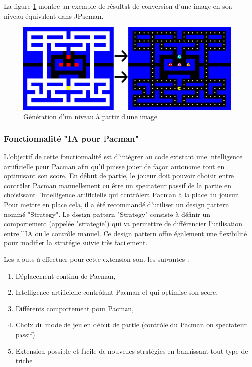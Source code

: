 \documentclass[12pt, openany]{report}
\begin{document}
La figure \ref{map_generator_img} montre un exemple de résultat de conversion d'une image en son niveau équivalent dans JPacman.
\begin{figure}[h]
	\centering
	\includegraphics[width=13cm]{Images/mapgenerator.jpg}
	\caption{\label{map_generator_img} Génération d'un niveau à partir d'une image}
\end{figure}

\subsubsection{Fonctionnalité "IA pour Pacman"}

L'objectif de cette fonctionnalité est d'intégrer au code existant une intelligence artificielle pour Pacman afin qu'il puisse jouer de façon autonome tout en optimisant son score. En début de partie, le joueur doit pouvoir choisir entre contrôler Pacman manuellement ou être un spectateur passif de la partie en choisissant l'intelligence artificielle qui contrôlera Pacman à la place du joueur. Pour mettre en place cela, il a été recommandé d'utiliser un design pattern nommé "Strategy". Le design pattern "Strategy" consiste à définir un comportement (appelée "strategie") qui va permettre de différencier l'utilisation entre l'IA ou le contrôle manuel. Ce design pattern offre également une flexibilité pour modifier la stratégie suivie très facilement.

Les ajouts à effectuer pour cette extension sont les suivantes :
\begin{enumerate}
	\item Déplacement continu de Pacman,
	\item Intelligence artificielle contrôlant Pacman et qui optimise son score,
	\item Différents comportement pour Pacman,
	\item Choix du mode de jeu en début de partie (contrôle du Pacman ou spectateur passif)
	\item Extension possible et facile de nouvelles stratégies en bannissant tout type de triche \\
	
\end{enumerate} 
\end{document}
